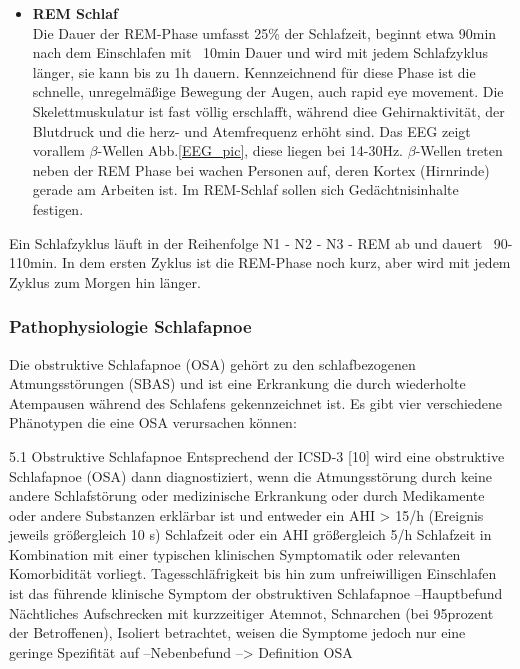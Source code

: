 \documentclass[a4paper, 12pt]{article}
\begin{document}
\begin{itemize}
\item \textbf{REM Schlaf}\\
Die Dauer der REM-Phase umfasst 25\% der Schlafzeit, beginnt etwa 90min nach dem Einschlafen mit ~10min Dauer und wird mit jedem Schlafzyklus länger, sie kann bis zu 1h dauern. Kennzeichnend für diese Phase ist die schnelle, unregelmäßige Bewegung der Augen, auch rapid eye movement. Die Skelettmuskulatur ist fast völlig erschlafft, während diee Gehirnaktivität, der Blutdruck und die herz- und Atemfrequenz erhöht sind. Das EEG zeigt vorallem \(\beta\)-Wellen Abb.\ref{EEG_pic}, diese liegen bei 14-30Hz. \(\beta\)-Wellen treten neben der REM Phase bei wachen Personen auf, deren Kortex (Hirnrinde) gerade am Arbeiten ist. Im REM-Schlaf sollen sich Gedächtnisinhalte festigen. \cite{flexikon}

\end{itemize}

Ein Schlafzyklus läuft in der Reihenfolge N1 - N2 - N3 - REM ab und dauert ~90-110min. In dem ersten Zyklus ist die REM-Phase noch kurz, aber wird mit jedem Zyklus zum Morgen hin länger.  \cite{phys_sleep_stages}

\cite{schlaf_krizan}

\subsubsection{Pathophysiologie Schlafapnoe}\label{schlafapnoe}
Die obstruktive Schlafapnoe (OSA) gehört zu den schlafbezogenen Atmungsstörungen (SBAS) und ist eine Erkrankung die durch wiederholte Atempausen während des Schlafens gekennzeichnet ist. Es gibt vier verschiedene Phänotypen die eine OSA verursachen können:

5.1 Obstruktive Schlafapnoe
Entsprechend der ICSD-3 [10] wird eine
obstruktive Schlafapnoe (OSA) dann diagnostiziert, wenn die Atmungsstörung
durch keine andere Schlafstörung oder
medizinische Erkrankung oder durch
Medikamente oder andere Substanzen
erklärbar ist und entweder ein AHI >
15/h (Ereignis jeweils größergleich 10 s) Schlafzeit oder ein AHI größergleich 5/h Schlafzeit in
Kombination mit einer typischen klinischen Symptomatik oder relevanten
Komorbidität vorliegt. 
Tagesschläfrigkeit bis hin zum unfreiwilligen Einschlafen ist das führende klinische Symptom der obstruktiven Schlafapnoe --Hauptbefund
Nächtliches Aufschrecken mit kurzzeitiger Atemnot, Schnarchen (bei 95prozent der Betroffenen),  Isoliert betrachtet, weisen die Symptome jedoch nur eine geringe Spezifität auf  --Nebenbefund
--> Definition OSA
\end{document}
